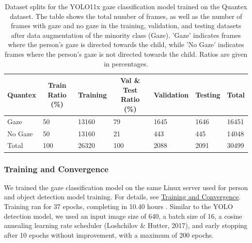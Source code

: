 \documentclass[
  man,floatsintext]{apa6}
\begin{document}
\begin{table}[tbp]

\begin{center}
\begin{threeparttable}

\caption{\label{tab:gaze-dataset-splits}Dataset splits for the YOLO11x gaze classification model trained on the Quantex dataset. The table shows the total number of frames, as well as the number of frames with gaze and no gaze in the training, validation, and testing datasets after data augmentation of the minority class (Gaze). 'Gaze' indicates frames where the person's gaze is directed towards the child, while 'No Gaze' indicates frames where the person's gaze is not directed towards the child. Ratios are given in percentages.}

\begin{tabular}{lllllll}
\toprule
Quantex & \multicolumn{1}{c}{Train Ratio (\%)} & \multicolumn{1}{c}{Training} & \multicolumn{1}{c}{Val \& Test Ratio (\%)} & \multicolumn{1}{c}{Validation} & \multicolumn{1}{c}{Testing} & \multicolumn{1}{c}{Total}\\
\midrule
Gaze & 50 & 13160 & 79 & 1645 & 1646 & 16451\\
No Gaze & 50 & 13160 & 21 & 443 & 445 & 14048\\
Total & 100 & 26320 & 100 & 2088 & 2091 & 30499\\
\bottomrule
\end{tabular}

\end{threeparttable}
\end{center}

\end{table}

\subsubsection{Training and Convergence}\label{training-and-convergence}

We trained the gaze classification model on the same Linux server used for person and object detection model training. For details, see \hyperref[training-face]{Training and Convergence}. Training ran for 37 epochs, completing in 10.40 hours . Similar to the YOLO detection model, we used an input image size of 640, a batch size of 16, a cosine annealing learning rate scheduler (Loshchilov \& Hutter, 2017), and early stopping after 10 epochs without improvement, with a maximum of 200 epochs.
\end{document}
